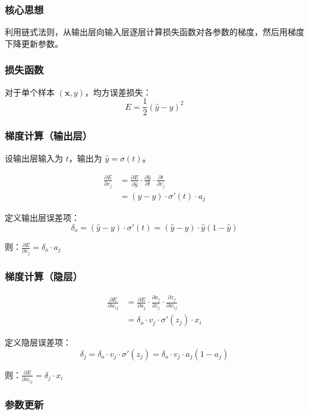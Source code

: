 \documentclass[12pt,a4paper]{ctexart}
\begin{document}
\subsubsection{核心思想}

利用链式法则，从输出层向输入层逐层计算损失函数对各参数的梯度，然后用梯度下降更新参数。

\subsubsection{损失函数}

对于单个样本 $(\mathbf{x}, y)$，均方误差损失：
\[
E = \frac{1}{2}(\hat{y} - y)^2
\]

\subsubsection{梯度计算（输出层）}

设输出层输入为 $t$，输出为 $\hat{y} = \sigma(t)$。

\begin{align}
\frac{\partial E}{\partial v_j} &= \frac{\partial E}{\partial \hat{y}} \cdot \frac{\partial \hat{y}}{\partial t} \cdot \frac{\partial t}{\partial v_j} \\
&= (\hat{y} - y) \cdot \sigma'(t) \cdot a_j
\end{align}

定义输出层误差项：
\[
\delta_o = (\hat{y} - y) \cdot \sigma'(t) = (\hat{y} - y) \cdot \hat{y}(1-\hat{y})
\]

则：$\frac{\partial E}{\partial v_j} = \delta_o \cdot a_j$

\subsubsection{梯度计算（隐层）}

\begin{align}
\frac{\partial E}{\partial w_{ij}} &= \frac{\partial E}{\partial a_j} \cdot \frac{\partial a_j}{\partial z_j} \cdot \frac{\partial z_j}{\partial w_{ij}} \\
&= \delta_o \cdot v_j \cdot \sigma'(z_j) \cdot x_i
\end{align}

定义隐层误差项：
\[
\delta_j = \delta_o \cdot v_j \cdot \sigma'(z_j) = \delta_o \cdot v_j \cdot a_j(1-a_j)
\]

则：$\frac{\partial E}{\partial w_{ij}} = \delta_j \cdot x_i$

\subsubsection{参数更新}
\end{document}
